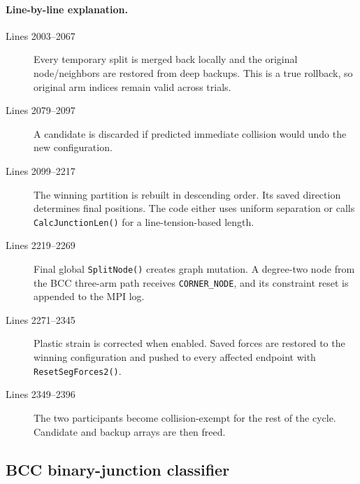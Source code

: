 \documentclass[11pt]{article}
\newcommand{\code}[1]{\texorpdfstring{\nolinkurl{#1}}{#1}}
\begin{document}
\paragraph{Line-by-line explanation.}
\begin{description}
\item[Lines 2003--2067] Every temporary split is merged back locally and the
original node/neighbors are restored from deep backups. This is a true
rollback, so original arm indices remain valid across trials.
\item[Lines 2079--2097] A candidate is discarded if predicted immediate
collision would undo the new configuration.
\item[Lines 2099--2217] The winning partition is rebuilt in descending order.
Its saved direction determines final positions. The code either uses uniform
separation or calls \code{CalcJunctionLen()} for a line-tension-based length.
\item[Lines 2219--2269] Final global \code{SplitNode()} creates graph
mutation. A degree-two node from the BCC three-arm path receives
\code{CORNER_NODE}, and its constraint reset is appended to the MPI log.
\item[Lines 2271--2345] Plastic strain is corrected when enabled. Saved
forces are restored to the winning configuration and pushed to every
affected endpoint with \code{ResetSegForces2()}.
\item[Lines 2349--2396] The two participants become collision-exempt for the
rest of the cycle. Candidate and backup arrays are then freed.
\end{description}

\subsection{BCC binary-junction classifier}


\end{document}
